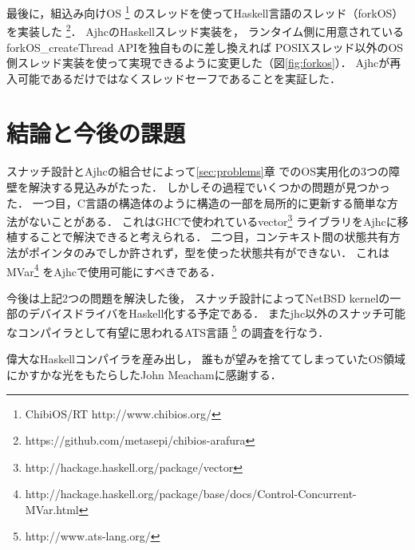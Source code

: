 \documentclass[submit,techreq,noauthor]{ipsj}
\begin{document}
最後に，組込み向けOS
\footnote{ChibiOS/RT http://www.chibios.org/}
のスレッドを使ってHaskell言語のスレッド（forkOS）を実装した
\footnote{https://github.com/metasepi/chibios-arafura}．
AjhcのHaskellスレッド実装を，
ランタイム側に用意されているforkOS\_createThread APIを独自ものに差し換えれば
POSIXスレッド以外のOS側スレッド実装を使って実現できるように変更した（図\ref{fig:forkos}）．
Ajhcが再入可能であるだけではなくスレッドセーフであることを実証した．

\section{結論と今後の課題}

スナッチ設計とAjhcの組合せによって\ref{sec:problems}章
でのOS実用化の3つの障壁を解決する見込みがたった．
しかしその過程でいくつかの問題が見つかった．
一つ目，C言語の構造体のように構造の一部を局所的に更新する簡単な方法がないことがある．
これはGHCで使われているvector\footnote{http://hackage.haskell.org/package/vector}
ライブラリをAjhcに移植することで解決できると考えられる．
二つ目，コンテキスト間の状態共有方法がポインタのみでしか許されず，型を使った状態共有ができない．
これはMVar\footnote{http://hackage.haskell.org/package/base/docs/Control-Concurrent-MVar.html}
をAjhcで使用可能にすべきである．

今後は上記2つの問題を解決した後，
スナッチ設計によってNetBSD kernelの一部のデバイスドライバをHaskell化する予定である．
またjhc以外のスナッチ可能なコンパイラとして有望に思われるATS言語
\footnote{http://www.ats-lang.org/}
の調査を行なう．

\begin{acknowledgment}
偉大なHaskellコンパイラを産み出し，
誰もが望みを捨ててしまっていたOS領域にかすかな光をもたらしたJohn Meachamに感謝する．
\end{acknowledgment}



\end{document}

